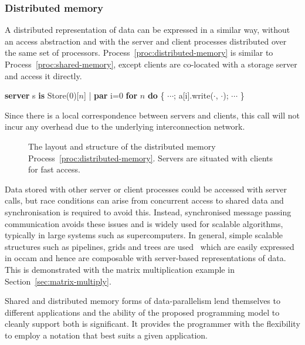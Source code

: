 \documentclass[11pt, conference, compsocconf, onecolumn]{IEEEtran}
\newcommand{\sect}[1]{Section~\ref{sec:#1}}
\newcommand{\proc}[1]{Process~\ref{proc:#1}}
\newcounter{process}
\newenvironment{Process}[1][]{\begin{procfloat}[ht]\vspace{-1.5mm}\refstepcounter{process}{\bf Process~\theprocess} #1}
{\vspace{-3.5mm}\end{procfloat}}
\newcommand{\w}[1]{{\bf #1}}
\newcommand{\inputtikz}[1]{
\begin{center}\end{center}}
\def\codespacing{1.5mm}
\newenvironment{myquote}
{\list{}{\leftmargin=4mm\rightmargin=4mm}\item[]}
{\endlist}
\newenvironment{code*}{\vspace{\codespacing}\begin{myquote}\begin{minipage}{\linewidth}\begin{alltt}}
{\end{alltt}\end{minipage}
\end{myquote}\vspace{\codespacing}
}
\begin{document}
\subsubsection{Distributed memory}

A distributed representation of data can be expressed in a similar way, without
an access abstraction and with the server and client processes distributed over
the same set of processors. \proc{distributed-memory} is similar to
\proc{shared-memory}, except clients are co-located with a storage
server and access it directly.
\begin{Process}
\begin{code*}
\w{server} s \w{is} Store(0)[\(n\)] |
\w{par} i=0 \w{for} \(n\) \w{do}
\{ \(\cdots\); a[i].write(\(\cdot\), \(\cdot\)); \(\cdots\) \}
\end{code*}
\label{proc:distributed-memory}
\end{Process}
Since there is a local correspondence between servers and clients, this call
will not incur any overhead due to the underlying interconnection network. 

\begin{figure}[t]
\inputtikz{figures/server-distributed-memory}

\caption{The layout and structure of the distributed memory
\proc{distributed-memory}.  Servers are situated with clients for fast access.}

\label{fig:distributed-memory}
\end{figure}

Data stored with other server or client processes could be accessed with server
calls, but race conditions can arise from concurrent access to shared data and
synchronisation is required to avoid this.
Instead, synchronised message passing communication avoids these issues and is
widely used for scalable algorithms, typically in large systems such as
supercomputers. In general, simple scalable structures such as pipelines, grids
and trees are used~\cite{Hansen93} which are easily expressed in occam and
hence are composable with server-based representations of data. 
This is demonstrated with the matrix multiplication example in
\sect{matrix-multiply}.

Shared and distributed memory forms of data-parallelism lend themselves to
different applications and the ability of the proposed programming model to
cleanly support both is significant. It provides the programmer with the
flexibility to employ a notation that best suits a given application.
\end{document}
